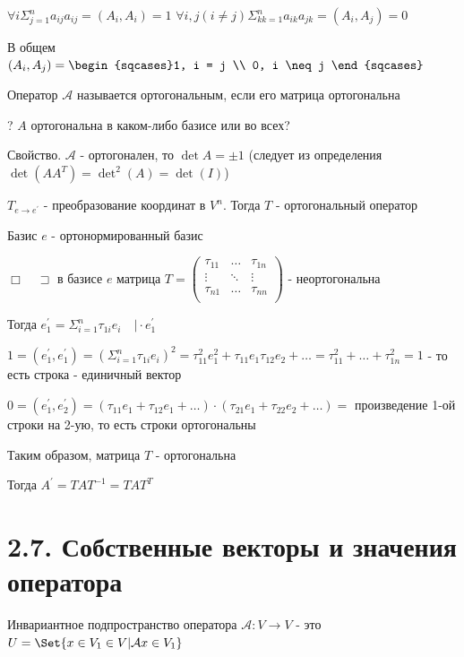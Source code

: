 \documentclass[12pt]{article}
\begin{document}
    $\forall i \Sigma^n_{j=1} a_{ij} a_{ij} = (A_i, A_i) = 1$
    $\forall i, j (i \neq j) \Sigma^n_{kk=1} a_{ik} a_{jk} = (A_i, A_j) = 0$

    В общем $(A_i, A_j) = \begin{sqcases}1, i = j \\ 0, i \neq j \end{sqcases}$

    \Def Оператор $\mathcal{A}$ называется ортогональным, если его матрица ортогональна

    ? $A$ ортогональна в каком-либо базисе или во всех?

    Свойство. $\mathcal{A}$ - ортогонален, то $\det A = \pm 1$ (следует из определения $\det(AA^T) = \det^2(A) = \det(I)$)

    \Th $T_{e\to e^\prime}$ - преобразование координат в $V^n$. Тогда $T$ - ортогональный оператор

    Базис $e$ - ортонормированный базис

    $\Box \quad \sqsupset $ в базисе $e$ матрица $T = \begin{pmatrix}
          \tau_{11} & \dots & \tau_{1n} \\
          \vdots & \ddots & \vdots \\
          \tau_{n1} & \dots & \tau_{nn} \\
    \end{pmatrix}$ - неортогональна

    Тогда $e_1^\prime = \Sigma_{i=1}^n \tau_{1i} e_i \quad \Big| \cdot e_1^\prime$

    $1 = (e_1^\prime, e_1^\prime) = (\Sigma_{i=1}^n \tau_{1i} e_i)^2 =
    \tau^2_{11} e^2_1 + \tau_{11} e_1 \tau_{12} e_2 + \dots = \tau_{11}^2 + \dots + \tau_{1n}^2 = 1$ - то есть строка - единичный вектор

    $0 = (e_1^\prime, e_2^\prime) = (\tau_{11} e_1 + \tau_{12}e_1 + \dots) \cdot
    (\tau_{21}e_1 + \tau_{22}e_2 + \dots) = $ произведение 1-ой строки на 2-ую, то есть строки ортогональны

    Таким образом, матрица $T$ - ортогональна

    \Nota Тогда $A^\prime = T A T^{-1} = T A T^T$

    \section{2.7. Собственные векторы и значения оператора}

    \Def Инвариантное подпространство оператора $\mathcal{A} : V \rightarrow V$ -
    это $U = \Set{x \in V_1 \in V | \mathcal{A}x \in V_1}$
\end{document}
